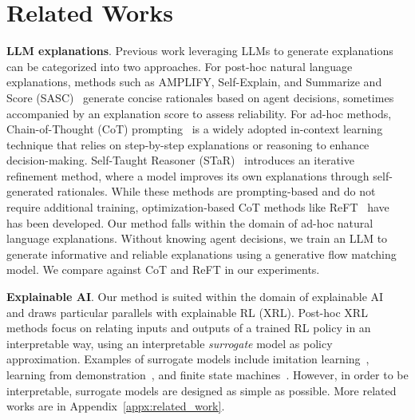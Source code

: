\section{Related Works}

\textbf{LLM explanations}. 
Previous work leveraging LLMs to generate explanations can be categorized into two approaches. For post-hoc natural language explanations, methods such as AMPLIFY\cite{krishna2024post}, Self-Explain\cite{rajagopal2021selfexplain}, and Summarize and Score (SASC)~\cite{singh2023explaining} generate concise rationales based on agent decisions, sometimes accompanied by an explanation score to assess reliability. For ad-hoc methods, Chain-of-Thought (CoT) prompting~\cite{wei2022chain} is a widely adopted in-context learning technique that relies on step-by-step explanations or reasoning to enhance decision-making. Self-Taught Reasoner (STaR)~\cite{zelikman2022star} introduces an iterative refinement method, where a model improves its own explanations through self-generated rationales. While these methods are prompting-based and do not require additional training, optimization-based CoT methods like ReFT~\cite{trung2024reft} have has been developed. Our method falls within the domain of ad-hoc natural language explanations. Without knowing agent decisions, we train an LLM to generate informative and reliable explanations using a generative flow matching model. We compare against CoT and ReFT in our experiments. 

\textbf{Explainable AI}. Our method is suited within  the domain of explainable AI~\cite{arrieta2020explainable,carvalho2019machine,ehsan2019automated,gunning2017explainable,ras2018explanation,gilpin2018explaining} and draws particular parallels with explainable RL (XRL). Post-hoc XRL methods focus on relating inputs and outputs of a trained RL policy in an interpretable way, using an interpretable \emph{surrogate} model as policy approximation. Examples of surrogate models include imitation learning~\cite{abbeel2004apprenticeship}, learning from demonstration~\cite{argall2009survey}, and finite state machines~\cite{koul2018learning, danesh2021re}. However, in order to be interpretable, surrogate models are designed as simple as possible. More related works are in Appendix~\ref{appx:related_work}.

